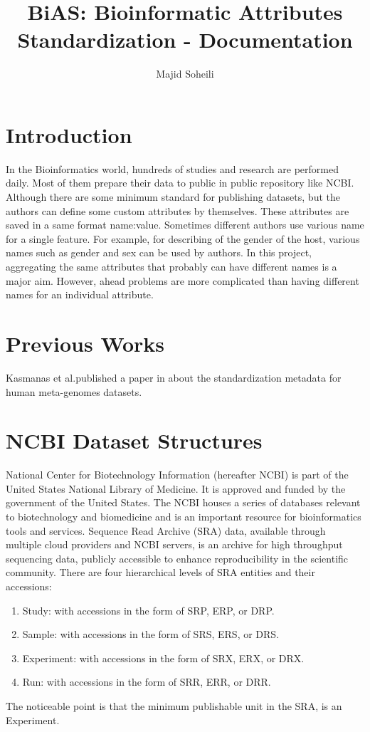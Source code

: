 \documentclass[11pt]{article}
\begin{document}
    \title{BiAS: Bioinformatic Attributes Standardization - Documentation}
    \author{Majid Soheili}
    \maketitle

    \section{Introduction}\label{sec:intro}
    In the Bioinformatics world, hundreds of studies and research are performed daily.
    Most of them prepare their data to public in public repository like NCBI.\@
    Although there are some minimum standard for publishing datasets, but the authors can define some custom attributes by themselves.
    These attributes are saved in a same format {name:value}.
    Sometimes different authors use various name for a single feature.
    For example, for describing of the gender of the host, various names such as gender and sex can be used by authors.
    In this project, aggregating the same attributes that probably can have different names is a major aim.
    However, ahead problems are more complicated than having different names for an individual attribute.
    
    \section{Previous Works}\label{sec:previouswork}
    Kasmanas et al.\@ published a paper in about the standardization metadata for human meta-genomes datasets.

    \section{NCBI Dataset Structures}\label{sec:ncbi}
    National Center for Biotechnology Information (hereafter NCBI) is part of the United States National Library of Medicine.
    It is approved and funded by the government of the United States.\@
    The NCBI houses a series of databases relevant to biotechnology and biomedicine and is an important resource for bioinformatics tools and services.
    Sequence Read Archive (SRA) data, available through multiple cloud providers and NCBI servers, is an archive for high throughput sequencing data, publicly accessible to enhance reproducibility in the scientific community.
    There are four hierarchical levels of SRA entities and their accessions:
    \begin{enumerate}
        \item Study: with accessions in the form of SRP, ERP, or DRP.\@
        \item Sample: with accessions in the form of SRS, ERS, or DRS.\@
        \item Experiment: with accessions in the form of SRX, ERX, or DRX.\@
        \item Run: with accessions in the form of SRR, ERR, or DRR.\@
    \end{enumerate}
    The noticeable point is that the minimum publishable unit in the SRA, is an Experiment.
\end{document}
